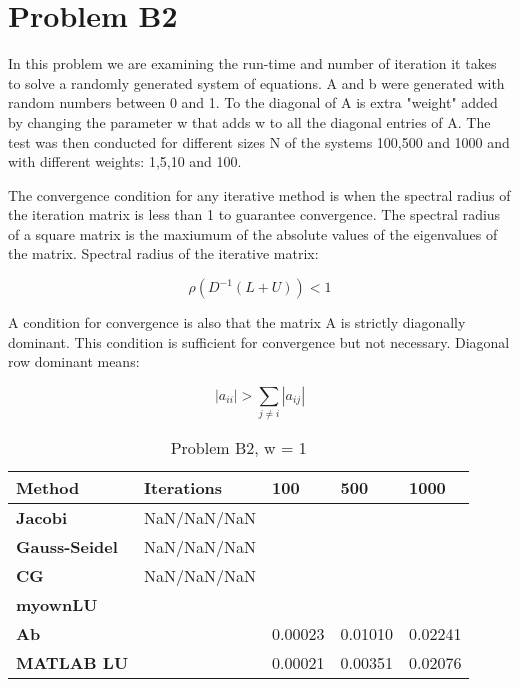 \documentclass[a4paper]{article}
\begin{document}
\section*{Problem B2}

In this problem we are examining the run-time and number of iteration it takes to solve a randomly generated system of equations. A and b were generated with random numbers between 0 and 1. To the diagonal of A is extra "weight" added by changing the parameter w that adds w to all the diagonal entries of A. The test was then conducted for different sizes N of the systems 100,500 and 1000 and with different weights: 1,5,10 and 100. 

The convergence condition for any iterative method is when the spectral radius of the iteration matrix is less than 1 to guarantee convergence. The spectral radius of a square matrix is the maxiumum of the absolute values of the eigenvalues of the matrix. Spectral radius of the iterative matrix: 

\begin{equation}
\rho (D^{-1}(L+U)) < 1
\end{equation}

A condition for convergence is also that the matrix A is strictly diagonally dominant. This condition is sufficient for convergence but not necessary. Diagonal row dominant means:

\begin{equation}
|a_{ii}| > \sum_{j\neq i} |a_{ij}| 
\end{equation}



\begin{table}[ht!]
\centering
\begin{tabular}{lllll} 
\textbf{Method}& \textbf{Iterations}& \textbf{100}& \textbf{500}& \textbf{1000} \\ \hline
\textbf{Jacobi}& NaN/NaN/NaN& & &  \\ 
\textbf{Gauss-Seidel}& NaN/NaN/NaN& & & \\
\textbf{CG} &NaN/NaN/NaN & & & \\
\textbf{myownLU}& & & & \\ 
\textbf{Ab}& & 0.00023& 0.01010& 0.02241\\
\textbf{MATLAB LU}& & 0.00021& 0.00351& 0.02076 \\
 \hline

\end{tabular}
\caption{Problem B2, w = 1}
\label{tab:tab1}
\end{table}
\end{document}
